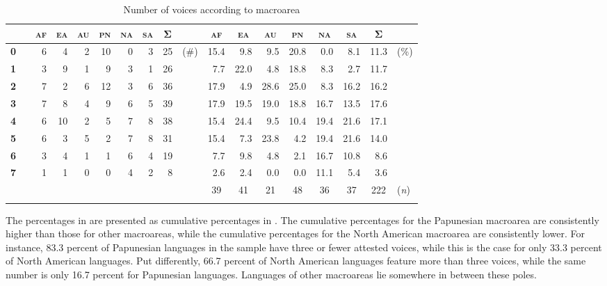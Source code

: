 \begin{table}
	\setlength{\tabcolsep}{3pt}
	\begin{tabularx}{.97\textwidth}{clrrrrrrrlrrrrrrrl}
		\lsptoprule
		& & \multicolumn{1}{c}{\textbf{\textsc{af}}} & \multicolumn{1}{c}{\textbf{\textsc{ea}}} & \multicolumn{1}{c}{\textbf{\textsc{au}}} & \multicolumn{1}{c}{\textbf{\textsc{pn}}} & \multicolumn{1}{c}{\textbf{\textsc{na}}} & \multicolumn{1}{c}{\textbf{\textsc{sa}}} & \multicolumn{1}{c}{\textbf{Σ}} & & \multicolumn{1}{c}{\textbf{\textsc{af}}} & \multicolumn{1}{c}{\textbf{\textsc{ea}}} & \multicolumn{1}{c}{\textbf{\textsc{au}}} & \multicolumn{1}{c}{\textbf{\textsc{pn}}} & \multicolumn{1}{c}{\textbf{\textsc{na}}} & \multicolumn{1}{c}{\textbf{\textsc{sa}}} & \multicolumn{1}{c}{\textbf{Σ}} & \\
		\midrule
		\textbf{0} & & 6 & 4 & 2 & 10 & 0 & 3 & 25 & (\#) & 15.4 & 9.8 & 9.5 & 20.8 & 0.0 & 8.1 & 11.3 & (\%) \\
		\textbf{1} & & 3 & 9 & 1 & 9 & 3 & 1 & 26 & & 7.7 & 22.0 & 4.8 & 18.8 & 8.3 & 2.7 & 11.7 & \\
		\textbf{2} & & 7 & 2 & 6 & 12 & 3 & 6 & 36 & & 17.9 & 4.9 & 28.6 & 25.0 & 8.3 & 16.2 & 16.2 & \\
		\textbf{3} & & 7 & 8 & 4 & 9 & 6 & 5 & 39 & & 17.9 & 19.5 & 19.0 & 18.8 & 16.7 & 13.5 & 17.6 & \\
		\textbf{4} & & 6 & 10 & 2 & 5 & 7 & 8 & 38 & & 15.4 & 24.4 & 9.5 & 10.4 & 19.4 & 21.6 & 17.1 & \\
		\textbf{5} & & 6 & 3 & 5 & 2 & 7 & 8 & 31 & & 15.4 & 7.3 & 23.8 & 4.2 & 19.4 & 21.6 & 14.0 & \\
		\textbf{6} & & 3 & 4 & 1 & 1 & 6 & 4 & 19 & & 7.7 & 9.8 & 4.8 & 2.1 & 16.7 & 10.8 & 8.6 & \\
		\textbf{7} & & 1 & 1 & 0 & 0 & 4 & 2 & 8 & & 2.6 & 2.4 & 0.0 & 0.0 & 11.1 & 5.4 & 3.6 & \\
		\midrule
		& & & & & & & & & & \multicolumn{1}{c}{39} & \multicolumn{1}{c}{41} & \multicolumn{1}{c}{21} & \multicolumn{1}{c}{48} & \multicolumn{1}{c}{36} & \multicolumn{1}{c}{37} & \multicolumn{1}{c}{222} & (\textit{n}) \\
		\lspbottomrule
	\end{tabularx}
	\caption{Number of voices according to macroarea}
	\label{tab:ch6:voice-macroarea}
\end{table}

The percentages in  are presented as cumulative percentages in . The cumulative percentages for the Papunesian macroarea are consistently higher than those for other macroareas, while the cumulative percentages for the North American macroarea are consistently lower. For instance, 83.3 percent of Papunesian languages in the sample have three or fewer attested voices, while this is the case for only 33.3 percent of North American languages. Put differently, 66.7 percent of North American languages feature more than three voices, while the same number is only 16.7 percent for Papunesian languages. Languages of other macroareas lie somewhere in between these poles. 

